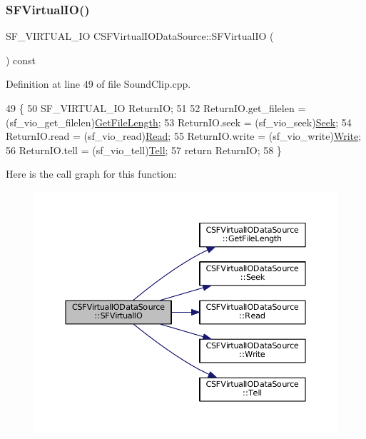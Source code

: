 \subsubsection{\texorpdfstring{S\+F\+Virtual\+I\+O()}{SFVirtualIO()}}
{\footnotesize\ttfamily S\+F\+\_\+\+V\+I\+R\+T\+U\+A\+L\+\_\+\+IO C\+S\+F\+Virtual\+I\+O\+Data\+Source\+::\+S\+F\+Virtual\+IO (\begin{DoxyParamCaption}{ }\end{DoxyParamCaption}) const}



Definition at line 49 of file Sound\+Clip.\+cpp.


\begin{DoxyCode}
49                                                        \{
50     SF\_VIRTUAL\_IO ReturnIO;
51     
52     ReturnIO.get\_filelen = (sf\_vio\_get\_filelen)\hyperlink{classCSFVirtualIODataSource_a94ee0d9f4703661ca7f2cad8cf294690}{GetFileLength};   
53     ReturnIO.seek = (sf\_vio\_seek)\hyperlink{classCSFVirtualIODataSource_a04735e135ffc05dd53fce944e772fcfc}{Seek};
54     ReturnIO.read = (sf\_vio\_read)\hyperlink{classCSFVirtualIODataSource_a40021962590f0911d8af1020397fbba1}{Read};
55     ReturnIO.write = (sf\_vio\_write)\hyperlink{classCSFVirtualIODataSource_ac1d38c4c9d8ba3e0a2affd7dd72283ee}{Write};   
56     ReturnIO.tell = (sf\_vio\_tell)\hyperlink{classCSFVirtualIODataSource_aae8e2b59f9753ed1f8baca1561b15962}{Tell};   
57     \textcolor{keywordflow}{return} ReturnIO;
58 \}
\end{DoxyCode}
Here is the call graph for this function\+:\nopagebreak
\begin{figure}[H]
\begin{center}
\leavevmode
\includegraphics[width=350pt]{classCSFVirtualIODataSource_a9c15fbbe734fdfc2af17ca8f424b7e43_cgraph}
\end{center}
\end{figure}
